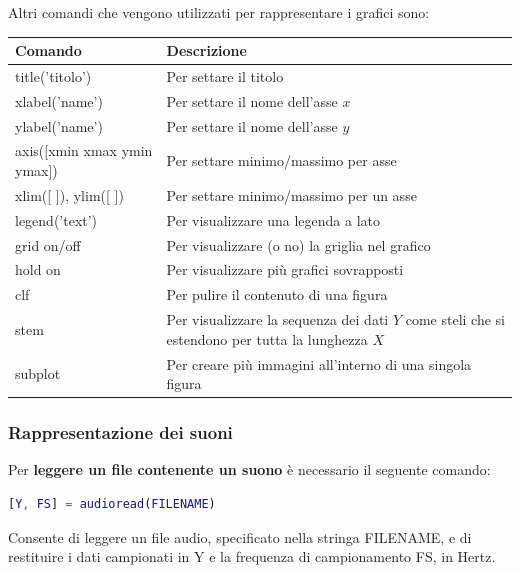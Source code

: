 \documentclass[a4paper]{article}
\begin{document}
	\noindent
	Altri comandi che vengono utilizzati per rappresentare i grafici sono:
	\begin{table}[!htbp]
		\centering
		\begin{tabular}{@{} l p{17em} @{}}
			\toprule
			Comando	& Descrizione \\
			\midrule
			\textsf{title('titolo')}				& Per settare il titolo \\
			\textsf{xlabel('name')}					& Per settare il nome dell'asse $x$ \\
			\textsf{ylabel('name')}					& Per settare il nome dell'asse $y$ \\
			\textsf{axis([xmin xmax ymin ymax])}	& Per settare minimo/massimo per asse \\
			\textsf{xlim([ ]), ylim([ ])}				& Per settare minimo/massimo per un asse \\
			\textsf{legend('text')}					& Per visualizzare una legenda a lato \\
			\textsf{grid on/off}					& Per visualizzare (o no) la griglia nel grafico \\
			\textsf{hold on}						& Per visualizzare più grafici sovrapposti \\
			\textsf{clf}							& Per pulire il contenuto di una figura \\
			\textsf{stem}							& Per visualizzare la sequenza dei dati $Y$ come steli che si estendono per tutta la lunghezza $X$ \\
			\textsf{subplot}						& Per creare più immagini all'interno di una singola figura \\
			\bottomrule
		\end{tabular}
	\end{table}\newpage
	
	\subsubsection{Rappresentazione dei suoni}
	
	Per \textbf{leggere un file contenente un suono} è necessario il seguente comando:
	\begin{lstlisting}[language=MATLAB]
[Y, FS] = audioread(FILENAME)\end{lstlisting}
	Consente di leggere un file audio, specificato nella stringa FILENAME, e di restituire i dati campionati in \textsf{Y} e la frequenza di campionamento \textsf{FS}, in Hertz.\newline
	
\end{document}

